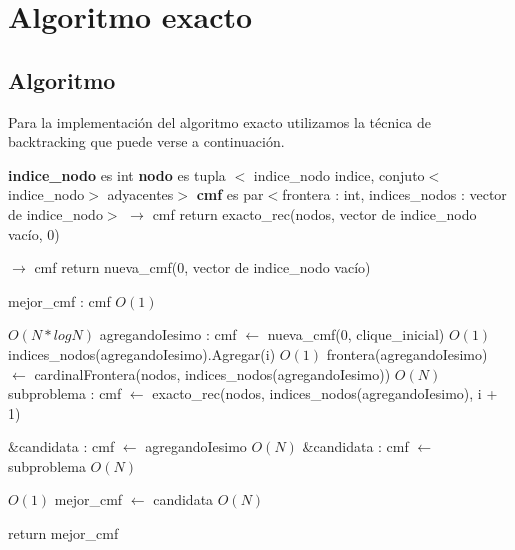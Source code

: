 \documentclass[a4paper, 10pt, twoside]{article}
\newenvironment{pseudo}[1][]{%
    \vspace{1em}%
    \begin{algorithmic}%
}
{%
    \end{algorithmic}%
    \vspace{1em}%
}
\newcommand{\Ode}[1]{\hfill $O(#1)$}
\begin{document}


\newpage

\section{Algoritmo exacto}
\subsection{Algoritmo}
Para la implementación del algoritmo exacto utilizamos la técnica de backtracking que puede verse a continuación.

\begin{pseudo}
\State \textbf{indice\_nodo} es int
\State \textbf{nodo} es tupla $<$ indice\_nodo indice, conjuto$<$indice\_nodo$>$ adyacentes$>$
\State \textbf{cmf} es par$<$frontera : int, indices\_nodos : vector de indice\_nodo$>$
\State
{} $\rightarrow$ cmf
	\State return exacto\_rec(nodos, vector de indice\_nodo vacío, 0)
\State
\EndProcedure

 $\rightarrow$ cmf
	 return nueva\_cmf(0, vector de indice\_nodo vacío) \EndIf

	\State mejor\_cmf : cmf									\Ode{1}

		 \Ode{N * log N}
			\State agregandoIesimo : cmf $\leftarrow$ nueva\_cmf(0, clique\_inicial)	\Ode{1}
			\State indices\_nodos(agregandoIesimo).Agregar(i)	\Ode{1}
			\State frontera(agregandoIesimo) $\leftarrow$
					cardinalFrontera(nodos, indices\_nodos(agregandoIesimo))	\Ode{N}
			\State subproblema : cmf $\leftarrow$
					exacto\_rec(nodos, indices\_nodos(agregandoIesimo), i + 1)

				\State \&candidata : cmf $\leftarrow$ agregandoIesimo			\Ode{N}
			\Else 
				\State \&candidata : cmf $\leftarrow$ subproblema				\Ode{N}
			\EndIf

			 \Ode{1}
				\State mejor\_cmf $\leftarrow$ candidata	\Ode{N}
			\EndIf
		\EndIf
	\EndFor

	\State return mejor\_cmf
\EndProcedure
\end{pseudo}
\end{document}
